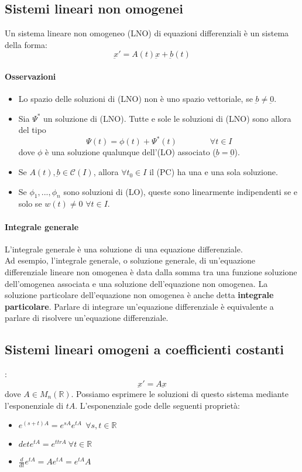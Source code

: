 \documentclass[a4paper,12pt]{article}
\newcommand{\cont}{\mathscr{C}}
\begin{document}
\subsection{Sistemi lineari non omogenei}
Un sistema lineare non omogeneo (LNO) di equazioni differenziali è un sistema della forma:
$$\underbar{x}' = A(t)\underbar{x} + \underbar{b}(t)$$
\paragraph{Osservazioni}
\begin{itemize}
 \item Lo spazio delle soluzioni di (LNO) non è uno spazio vettoriale, se $\underbar{b}\neq\underbar{0}$.
 \item Sia $\Psi^*$ un soluzione di (LNO). Tutte e sole le soluzioni di (LNO) sono allora del tipo
       $$ \Psi(t) = \phi(t) + \Psi^*(t)\qquad \qquad \forall t \in I$$
       dove $\phi$ è una soluzione qualunque dell'(LO) associato ($\underbar{b}=\underbar{0}$).
 \item Se $A(t) , \underbar{b}\in \cont(I)$, allora $ \forall t_0 \in I$ il (PC)  ha una e una sola soluzione.
 \item Se $\phi_1,...,\phi_n$ sono soluzioni di (LO), queste sono linearmente indipendenti se e solo se $w(t)\neq0$ $\forall t \in I$.
\end{itemize}


\paragraph{Integrale generale}
L'integrale generale è una soluzione di una equazione differenziale.\\
Ad esempio, l'integrale generale, o soluzione generale, di un'equazione differenziale lineare non omogenea è data dalla somma tra una funzione soluzione dell'omogenea associata e una soluzione dell'equazione non omogenea. La soluzione particolare dell'equazione non omogenea è anche detta \textbf{integrale particolare}. Parlare di integrare un'equazione differenziale è equivalente a parlare di risolvere un'equazione differenziale.

\subsection{Sistemi lineari omogeni a coefficienti costanti}:
$$\underbar{x}' = A\underbar{x}$$
dove $A \in M_n(\mathbb{R})$. Possiamo esprimere le soluzioni di questo sistema mediante l'esponenziale di $tA$.
L'esponenziale gode delle seguenti proprietà:
\begin{itemize}
\item $e^{(s+t)A} = e^{sA}e^{tA} \ \ \forall s,t \in \mathbb{R} $
\item $det e^{tA}=e^{ttrA} \ \forall t \in \mathbb{R} $
\item $	\frac{d}{dt} e^{tA} = A e^{tA} = e^{tA}A$
\end{itemize}
\end{document}
